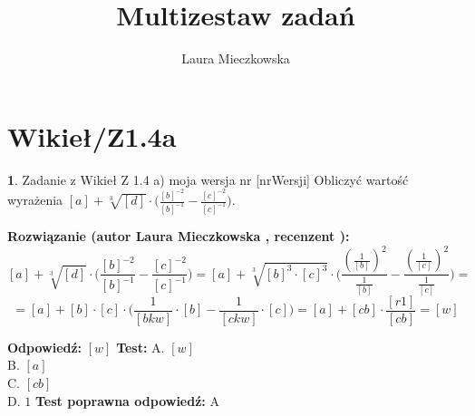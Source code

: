 \documentclass[12pt, a4paper]{article}
\title{Multizestaw zadań}
\author{Laura Mieczkowska}
\date{}
\theoremstyle{definition} %
\newtheorem{zad}{}
\newcommand{\kategoria}[1]{\section{#1}} %
\newcommand{\zadStart}[1]{\begin{zad}#1\newline} %
\newcommand{\zadStop}{\end{zad}}   %
\newcommand{\rozwStart}[2]{\noindent \textbf{Rozwiązanie (autor #1 , recenzent #2): }\newline} %
\newcommand{\odpStart}{\noindent \textbf{Odpowiedź:}\newline}    %
\newcommand{\odpStop}{\newline}                                             %
\newcommand{\testStart}{\noindent \textbf{Test:}\newline} %
\newcommand{\testStop}{\newline} %
\newcommand{\kluczStart}{\noindent \textbf{Test poprawna odpowiedź:}\newline} %
\newcommand{\kluczStop}{\newline} %
\begin{document}
\maketitle


\kategoria{Wikieł/Z1.4a}
\zadStart{Zadanie z Wikieł Z 1.4 a) moja wersja nr [nrWersji]}
Obliczyć wartość wyrażenia $[a]+\sqrt[3]{[d]}\cdot \big(\frac{[b]^{-2}}{[b]^{-1}}-\frac{[c]^{-2}}{[c]^{-1}}\big)$.
\zadStop
\rozwStart{Laura Mieczkowska}{}
$$[a]+\sqrt[3]{[d]}\cdot \big(\frac{[b]^{-2}}{[b]^{-1}}-\frac{[c]^{-2}}{[c]^{-1}}\big)
=[a]+\sqrt[3]{[b]^3\cdot[c]^3}\cdot \big(\frac{(\frac{1}{[b]})^{2}}{\frac{1}{[b]}}-\frac{(\frac{1}{[c]})^{2}}{\frac{1}{[c]}}\big)=$$
$$=[a]+[b]\cdot[c]\cdot\big(\frac{1}{[bkw]}\cdot[b]-\frac{1}{[ckw]}\cdot[c]\big)=[a]+[cb]\cdot\frac{[r1]}{[cb]}=[w]$$


\odpStart
$[w]$
\odpStop
\testStart
A. $[w]$ \\
B. $[a]$ \\
C. $[cb]$ \\
D. $1$ 
\testStop
\kluczStart
A
\kluczStop
\end{document}
